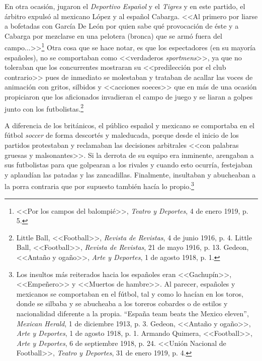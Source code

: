 \documentclass[11pt,a5paper,twoside]{book} %
\begin{document}
En otra ocasión, jugaron el \emph{Deportivo Español} y el \emph{Tigres} y en este partido, el árbitro expulsó al mexicano López y al español Cabarga. <<Al primero por liarse a bofetadas con García De León por quien sabe qué provocación de éste y a Cabarga por mezclarse en una pelotera (bronca) que se armó fuera del campo...>>\footnote{<<Por los campos del balompié>>, \emph{Teatro y Deportes}, 4 de enero 1919, p. 5.} Otra cosa que se hace notar, es que los espectadores (en su mayoría españoles), no se comportaban como <<verdaderos \emph{sportmens}>>, ya que no toleraban que los concurrentes mostraran su <<predilección por el club contrario>> pues de inmediato se molestaban y trataban de acallar las voces de animación con gritos, silbidos y <<acciones soeces>> que en más de una ocasión propiciaron que los aficionados invadieran el campo de juego y se liaran a golpes junto con los futbolistas.\footnote{Little Ball, <<Football>>, \emph{Revista de Revistas}, 4 de junio 1916, p. 4. Little Ball, <<Football>>, \emph{Revista de Revistas},
21 de mayo 1916, p. 13. Gedeon, <<Antaño y ogaño>>, \emph{Arte y Deportes}, 1 de agosto 1918, p. 1.}

A diferencia de los británicos, el público español y mexicano se comportaba en el fútbol \emph{soccer} de forma descortés y maleducada, porque desde el inicio de los partidos protestaban y reclamaban las decisiones arbitrales <<con palabras gruesas y malsonantes>>. Si la derrota de su equipo era inminente, arengaban a sus futbolistas para que golpearan a los rivales y cuando esto ocurría, festejaban y aplaudían las patadas y las zancadillas. Finalmente, insultaban y abucheaban a la porra contraria que por supuesto también hacía lo propio.\footnote{Los insultos más reiterados hacia los españoles eran <<Gachupín>>, <<Empeñero>> y <<Muertos de hambre>>. Al parecer, españoles y mexicanos se comportaban en el fútbol, tal y como lo hacían en los toros, donde se silbaba y se abucheaba a los toreros cobardes o de estilos y nacionalidad diferente a la propia. ``España team beats the Mexico eleven'', \emph{Mexican Herald}, 1 de diciembre 1913, p. 3. Gedeon, <<Antaño y ogaño>>, \emph{Arte y Deportes}, 1 de agosto 1918, p. 1. Armando Quimera, <<Football>>, \emph{Arte y Deportes}, 6 de septiembre 1918, p. 24. <<Unión Nacional de Football>>, \emph{Teatro y Deportes}, 31 de enero 1919, p. 4.}
\end{document}
